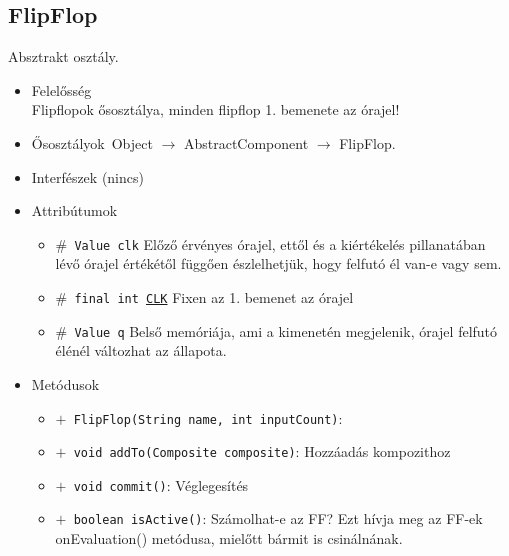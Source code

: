 \subsection{FlipFlop}
Absztrakt osztály.
\begin{itemize}
\item Felelősség\\
Flipflopok ősosztálya, minden flipflop 1. bemenete az órajel!
\item Ősosztályok\ Object $\rightarrow{}$ AbstractComponent $\rightarrow{}$ FlipFlop.
\item Interfészek (nincs)
\item Attribútumok $\ $
\begin{itemize}
	\item[] \texttt{$\#$ Value clk} Előző érvényes órajel, ettől és a kiértékelés pillanatában lévő órajel értékétől  függően észlelhetjük, hogy felfutó él van-e vagy sem.
	\item[] \texttt{$\#$ final int \underline{CLK}} Fixen az 1. bemenet az órajel
	\item[] \texttt{$\#$ Value q} Belső memóriája, ami a kimenetén megjelenik, órajel felfutó élénél változhat az állapota.
\end{itemize}
\item Metódusok$\ $
\begin{itemize}
	\item[] \texttt{$+$ FlipFlop(String name, int inputCount)}: 
	\item[] \texttt{$+$ void addTo(Composite composite)}: Hozzáadás kompozithoz
	\item[] \texttt{$+$ void commit()}: Véglegesítés
	\item[] \texttt{$+$ boolean isActive()}: Számolhat-e az FF? Ezt hívja meg az FF-ek onEvaluation() metódusa, mielőtt  bármit is csinálnának.
\end{itemize}
\end{itemize}

